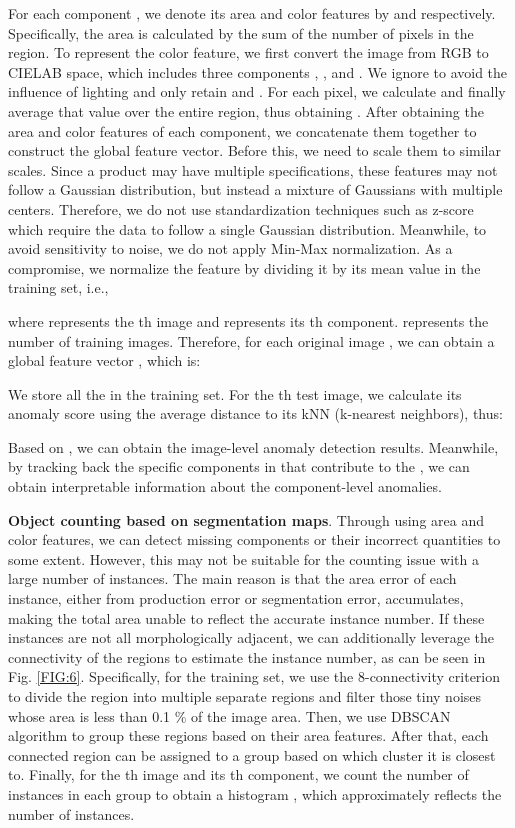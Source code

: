\documentclass[final,5p,times,twocolumn]{elsarticle}
\begin{document}
For each component , we denote its area and color features by  and  respectively. Specifically, the area  is calculated by the sum of the number of pixels in the region. To represent the color feature, we first convert the image from RGB to CIELAB space, which includes three components , , and . We ignore  to avoid the influence of lighting and only retain  and . For each pixel, we calculate  and finally average that value over the entire region, thus obtaining . After obtaining the area and color features of each component, we concatenate them together to construct the global feature vector. Before this, we need to scale them to similar scales. Since a product may have multiple specifications, these features may not follow a Gaussian distribution, but instead a mixture of Gaussians with multiple centers. Therefore, we do not use standardization techniques such as z-score which require the data to follow a single Gaussian distribution. Meanwhile, to avoid sensitivity to noise, we do not apply Min-Max normalization. As a compromise, we normalize the feature by dividing it by its mean value in the training set, i.e., 


where  represents the th image and  represents its th component.  represents the number of training images. Therefore, for each original image , we can obtain a global feature vector , which is:


We store all the  in the training set. For the th test image, we calculate its anomaly score  using the average  distance to its kNN (k-nearest neighbors), thus:

Based on , we can obtain the image-level anomaly detection results. Meanwhile, by tracking back the specific components in  that contribute to the , we can obtain interpretable information about the component-level anomalies. 

\textbf{Object counting based on segmentation maps}. Through using area and color features, we can detect missing components or their incorrect quantities to some extent. However, this may not be suitable for the counting issue with a large number of instances. The main reason is that the area error of each instance, either from production error or segmentation error, accumulates, making the total area unable to reflect the accurate instance number. If these instances are not all morphologically adjacent, we can additionally leverage the connectivity of the regions to estimate the instance number, as can be seen in Fig. \ref{FIG:6}. Specifically, for the training set, we use the 8-connectivity criterion to divide the region into multiple separate regions and filter those tiny noises whose area is less than 0.1 \% of the image area. Then, we use DBSCAN \cite{ester1996density} algorithm to group these regions based on their area features. After that, each connected region can be assigned to a group based on which cluster it is closest to. Finally, for the th image and its th component, we count the number of instances in each group to obtain a histogram , which approximately reflects the number of instances.
\end{document}

